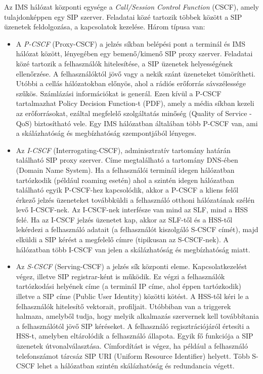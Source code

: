 Az IMS hálózat központi egysége a \emph{Call/Session Control Function} (CSCF), amely tulajdonképpen egy SIP szerver. Feladatai közé tartozik többek között a SIP üzenetek feldolgozása, a kapcsolatok kezelése. Három típusa van:
\begin{itemize}
\item A \emph{P-CSCF} (Proxy-CSCF) a jelzés síkban belépési pont a terminál és IMS hálózat között, lényegében egy bemenő/kimenő SIP proxy szerver. Feladatai közé tartozik a felhasználók hitelesítése, a SIP üzenetek helyességének ellenőrzése. A felhasználóktól jövő vagy a nekik szánt üzeneteket tömörítheti. Utóbbi a cellás hálózatokban előnyös, ahol a rádiós erőforrás sávszélessége szűkös. Számlázási információkat is generál. Ezen kívül a P-CSCF tartalmazhat Policy Decision Function-t (PDF), amely a média síkban kezeli az erőforrásokat, ezáltal megfelelő szolgáltatás minőség (Quality of Service - QoS) biztosítható vele. Egy IMS hálózatban általában több P-CSCF van, ami a skálázhatóság és megbízhatóság szempontjából lényeges.
\item Az \emph{I-CSCF} (Interrogating-CSCF), adminisztratív tartomány határán található SIP proxy szerver. Címe megtalálható a tartomány DNS-ében (Domain Name System). Ha a felhasználói terminál idegen hálózatban tartózkodik (például roaming esetén) ahol a szintén idegen hálózatban található egyik P-CSCF-hez kapcsolódik, akkor a P-CSCF a kliens felől érkező jelzés üzeneteket továbbküldi a felhasználó otthoni hálózatának szélén levő I-CSCF-nek. Az I-CSCF-nek interfésze van mind az SLF, mind a HSS felé. Ha az I-CSCF jelzés üzenetet kap, akkor az SLF-től és a HSS-től lekérdezi a felhasználó adatait (a felhasználót kiszolgáló S-CSCF címét), majd elküldi a SIP kérést a megfelelő címre (tipikusan az S-CSCF-nek). A hálózatban több I-CSCF van jelen a skálázhatóság és megbízhatóság miatt.
\item Az \emph{S-CSCF} (Serving-CSCF) a jelzés sík központi eleme. Kapcsolatkezelést végez, illetve SIP registrar-ként is működik. Ez végzi a felhasználók tartózkodási helyének címe (a terminál IP címe, ahol éppen tartózkodik) illetve a SIP címe (Public User Identity) közötti kötést. A HSS-től kéri le a felhasználók hitelesítő vektorait, profiljait. Utóbbiban van a triggerek halmaza, amelyből tudja, hogy melyik alkalmazás szervernek kell továbbítania a felhasználótól jövő SIP kéréseket. A felhasználó regisztrációjáról értesíti a HSS-t, amelyben eltárolódik a felhasználó állapota. Egyik fő funkciója a SIP üzenetek útvonalválasztása. Címfordítást is végez, ha például a felhasználó telefonszámot tárcsáz SIP URI (Uniform Resource Identifier) helyett. Több S-CSCF lehet a hálózatban szintén skálázhatóság és redundancia végett.
\end{itemize}

